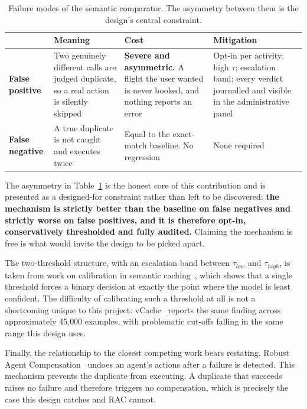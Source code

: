 \begin{table}[htbp]
  \centering
  \caption{Failure modes of the semantic comparator. The asymmetry between
    them is the design's central constraint.}
  \label{tab:semfail}
  \small
  \begin{tabular}{@{}p{0.7in}p{1.38in}p{1.02in}p{1.58in}@{}}
    \toprule
    & \textbf{Meaning} & \textbf{Cost} & \textbf{Mitigation} \\
    \midrule
    \textbf{False positive} &
      Two genuinely different calls are judged duplicate, so a real action is
      silently skipped &
      \textbf{Severe and asymmetric.} A flight the user wanted is never booked,
      and nothing reports an error &
      Opt-in per activity; high $\tau$; escalation band; every verdict
      journalled and visible in the administrative panel \\
    \textbf{False negative} &
      A true duplicate is not caught and executes twice &
      Equal to the exact-match baseline. No regression & None required \\
    \bottomrule
  \end{tabular}
\end{table}

The asymmetry in Table~\ref{tab:semfail} is the honest core of this
contribution and is presented as a designed-for constraint rather than left to
be discovered: \textbf{the mechanism is strictly better than the baseline on
false negatives and strictly worse on false positives, and it is therefore
opt-in, conservatively thresholded and fully audited.} Claiming the mechanism
is free is what would invite the design to be picked apart.

The two-threshold structure, with an escalation band between $\tau_{low}$ and
$\tau_{high}$, is taken from work on calibration in semantic
caching~\cite{calibration2026}, which shows that a single threshold forces a
binary decision at exactly the point where the model is least confident. The
difficulty of calibrating such a threshold at all is not a shortcoming unique
to this project: vCache~\cite{vcache2026} reports the same finding across
approximately 45{,}000 examples, with problematic cut-offs falling in the same
range this design uses.

Finally, the relationship to the closest competing work bears restating. Robust
Agent Compensation~\cite{rac2026} undoes an agent's actions after a failure is
detected. This mechanism prevents the duplicate from executing. A duplicate
that succeeds raises no failure and therefore triggers no compensation, which
is precisely the case this design catches and RAC cannot.

